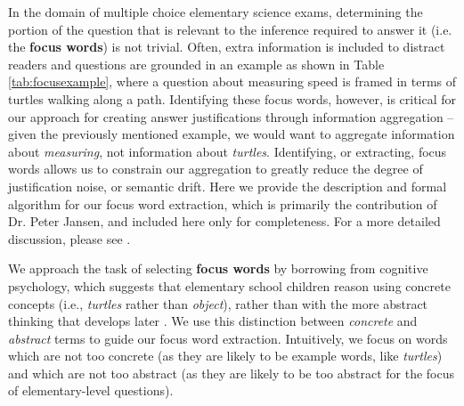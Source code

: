 In the domain of multiple choice elementary science exams, determining the portion of the question that is relevant to the inference required to answer it (i.e. the \textbf{focus words}) is not trivial.  Often, extra information is included to distract readers and questions are grounded in an example as shown in Table \ref{tab:focusexample}, where a question about measuring speed is framed in terms of turtles walking along a path.  Identifying these focus words, however, is critical for our approach for creating answer justifications through information aggregation -- given the previously mentioned example, we would want to aggregate information about \textit{measuring}, not information about \textit{turtles}.  Identifying, or extracting, focus words allows us to constrain our aggregation to greatly reduce the degree of justification noise, or semantic drift. 
Here we provide the description and formal algorithm for our focus word extraction, which is primarily the contribution of Dr. Peter Jansen, and included here only for completeness.  For a more detailed discussion, please see \citet{jansen2017framing}.


We approach the task of selecting \textbf{focus words} by borrowing from cognitive psychology, which suggests that elementary school children reason using concrete concepts (i.e., \textit{turtles} rather than \textit{object}), rather than with the more abstract thinking that develops later \citep{Piaget1954}.  We use this distinction between \textit{concrete} and \textit{abstract} terms to guide our focus word extraction.  Intuitively, we focus on words which are not too concrete (as they are likely to be example words, like \textit{turtles}) and which are not too abstract (as they are likely to be too abstract for the focus of elementary-level questions).  


